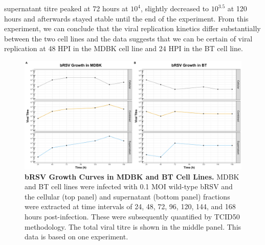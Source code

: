 supernatant titre peaked at 72 hours at \(10^{4}\), slightly decreased to \(10^{3.5}\) at 120 hours and afterwards stayed stable until the end of the experiment. From this experiment, we can conclude that the viral replication kinetics differ substantially between the two cell lines and the data suggests that we can be certain of viral replication at 48 HPI in the MDBK cell line and 24 HPI in the BT cell line.

\begin{figure}
    \centering
    \includegraphics[width=1\linewidth]{07. Chapter 2/Figs/01. Technologies/01. growth_curves.pdf}
    \caption[bRSV Growth Curves in MDBK and BT Cell Lines.]{\textbf{bRSV Growth Curves in MDBK and BT Cell Lines.} MDBK and BT cell lines were infected with 0.1 MOI wild-type bRSV and the cellular (top panel) and supernatant (bottom panel) fractions were extracted at time intervals of 24, 48, 72, 96, 120, 144, and 168 hours post-infection. These were subsequently quantified by TCID50 methodology. The total viral titre is shown in the middle panel. This data is based on one experiment.}
    \label{fig:bRSV growth curves in MDBK and BT cell lines}
\end{figure}



